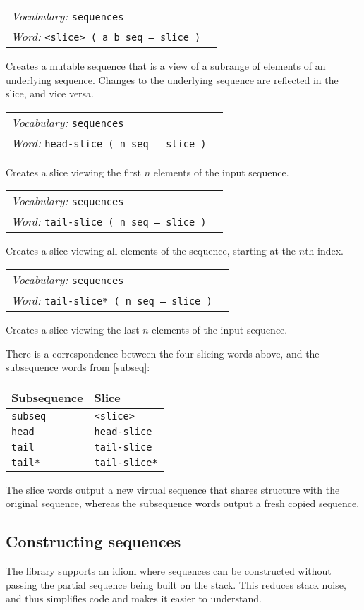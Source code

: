 \documentclass{book}
\newcommand{\vocabulary}[1]{\emph{Vocabulary:} \texttt{#1}&\\}
\newcommand{\ordinaryword}[2]{\index{\texttt{#1}}\emph{Word:} \texttt{#2}&\\}
\newcommand{\wordtable}[1]{


\begin{tabularx}{12cm}{lX}
\hline
#1
\hline
\end{tabularx}

}
\begin{document}
\wordtable{
\vocabulary{sequences}
\ordinaryword{<slice>}{<slice> ( a b seq -- slice )}
}
Creates a mutable sequence that is a view of a subrange of elements of an underlying sequence. Changes to the underlying sequence are reflected in the slice, and vice versa.
\wordtable{
\vocabulary{sequences}
\ordinaryword{head-slice}{head-slice ( n seq -- slice )}
}
Creates a slice viewing the first $n$ elements of the input sequence.
\wordtable{
\vocabulary{sequences}
\ordinaryword{tail-slice}{tail-slice ( n seq -- slice )}
}
Creates a slice viewing all elements of the sequence, starting at the $n$th index.

\wordtable{
\vocabulary{sequences}
\ordinaryword{tail-slice*}{tail-slice* ( n seq -- slice )}
}
Creates a slice viewing the last $n$ elements of the input sequence.

There is a correspondence between the four slicing words above, and the subsequence words from \ref{subseq}:

\begin{tabular}[t]{l|l}
Subsequence&Slice\\
\hline
\verb|subseq|&\verb|<slice>|\\
\verb|head|&\verb|head-slice|\\
\verb|tail|&\verb|tail-slice|\\
\verb|tail*|&\verb|tail-slice*|
\end{tabular}

The slice words output a new virtual sequence that shares structure with the original sequence, whereas the subsequence words output a fresh copied sequence.

\subsection{\label{make-seq}Constructing sequences}

The library supports an idiom where sequences can be constructed without passing the partial sequence being built on the stack. This reduces stack noise, and thus simplifies code and makes it easier to understand.
\end{document}
